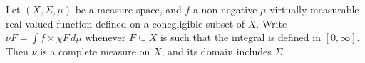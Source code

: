  Let $(X,\Sigma,\mu)$ be a measure
space, and $f$ a non-negative $\mu$-virtually measurable real-valued
function defined on a conegligible subset of $X$.   Write
$\nu F=\int f\times\chi F\,d\mu$ whenever $F\subseteq X$ is such that
the integral is
defined in $[0,\infty]$.
Then $\nu$ is a complete measure on $X$, and its domain includes
$\Sigma$.

